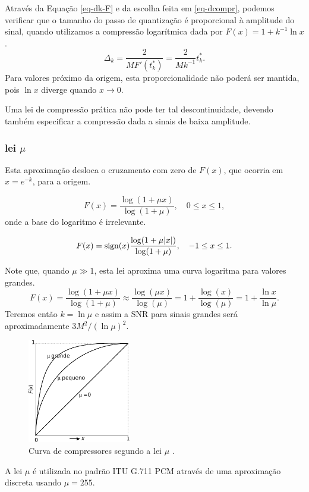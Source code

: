 \begin{frame}[allowframebreaks]
  Através da Equação \ref{eq-dk-F} e da escolha feita em \ref{eq-dcompr}, podemos verificar
  que o tamanho do passo de quantização é proporcional à amplitude do sinal, quando utilizamos
  a compressão logarítmica dada por $F(x) = 1 + k^{-1} \ln x$. 
  \begin{equation}
  \Delta_k = \frac{2}{M F'(t_k^{\ast})} = \frac{2}{M k^{-1}} t_k^{\ast} .
  \end{equation}
  Para valores próximo da origem,
  esta proporcionalidade não poderá ser mantida, pois $\ln x$ diverge
  quando $x \rightarrow 0$.

  Uma lei de compressão prática não pode ter tal descontinuidade, devendo também especificar a compressão
  dada a sinais de baixa amplitude.
\end{frame}

\begin{frame}[allowframebreaks]
  \frametitle{lei $\mu$}
   Esta aproximação desloca o cruzamento com zero de $F(x)$, 
   que ocorria em $x = e^{-k}$, para a origem.

   \begin{equation}
   F(x) = \frac{\log (1 + \mu x)}{ \log (1 + \mu)} , \quad 0 \leq x \leq 1 ,
   \end{equation}
   onde a base do logaritmo é irrelevante.

  \begin{equation}
   F(x) = \operatorname{sign} (x) \frac{\log (1 + \mu |x|)}{ \log (1 + \mu)} , \quad -1 \leq x \leq 1 .
  \end{equation}

  \framebreak

  Note que, quando $\mu \gg 1$, esta lei aproxima uma curva logaritma para valores grandes.
  \begin{equation}
  F(x) = \frac{\log (1 + \mu x)}{\log(1+\mu)} \approx \frac{\log(\mu x)}{\log(\mu)} = 1 + \frac{\log(x)}{\log(\mu)} = 1 + \frac{\ln x}{\ln \mu} .
  \end{equation}
  Teremos então $k = \ln \mu$ e assim a SNR para sinais grandes será aproximadamente $3M^2/(\ln \mu)^2$.

  \framebreak

  \begin{figure}[h!]
  \centering
  \includegraphics[width=0.4\textwidth]{images/mulaw.pdf}
  \caption{Curva de compressores segundo a lei $\mu$ \citep{tokunbo}.}
  \label{fig:mulaw}
  \end{figure}
  
  A lei $\mu$ é utilizada no padrão ITU G.711 PCM através de uma aproximação discreta usando $\mu=255$.
\end{frame}

